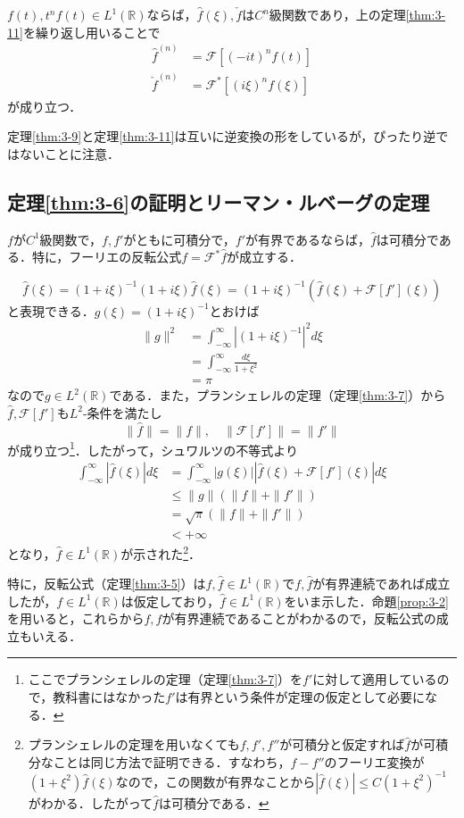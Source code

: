 \documentclass[dvipdfmx,a4j,10pt]{jsarticle}
\makeatletter
\theoremstyle{mystyle1}
\theoremstyle{mystyle3}
\theoremstyle{mystyle4}
\theoremstyle{mystyle6}
\theoremstyle{mystyle2}
\theoremstyle{mystyle5}
\newtheorem{theorem*}{定理}
\renewenvironment{proof}[1][\proofname]{\par
  \pushQED{\qed}%
  \normalfont
  \topsep6\p@\@plus6\p@ \trivlist
  \item[\hskip\labelsep{\bfseries\sffamily #1}]\ignorespaces
}{%
  \popQED\endtrivlist\@endpefalse
}
\renewcommand\proofname{証明}
\newenvironment{thm*}[1][]
{\begin{tcolorbox}[
    enhanced,
    boxrule=0pt,
    arc=0mm,
    frame hidden,
    borderline west={2pt}{-4pt}{red},
    breakable = true
    ]
    \begin{theorem*}[#1]
}
{\end{theorem*}\end{tcolorbox}}
\makeatother
\begin{document}
$f(t),t^nf(t)\in L^1(\mathbb{R})$ならば，$\hat f(\xi),\check f$は$C^n$級関数であり，上の定理\ref{thm:3-11}を繰り返し用いることで
\[
	\begin{split}
		\hat f^{(n)}&=\mathcal{F}[(-it)^nf(t)] \\
		\check f^{(n)}&=\mathcal{F}^*[(i\xi)^n f(\xi)]
	\end{split}
\]
が成り立つ．

定理\ref{thm:3-9}と定理\ref{thm:3-11}は互いに逆変換の形をしているが，ぴったり逆ではないことに注意．


\subsection{定理\ref{thm:3-6}の証明とリーマン・ルベーグの定理}\label{sec:3-7}

\begin{thm*}
	$f$が$C^1$級関数で，$f,f'$がともに可積分で，$f'$が有界であるならば，$\hat f$は可積分である．特に，フーリエの反転公式$f=\mathcal{F}^*\hat f$が成立する．
\end{thm*}

\begin{proof}
	\[
		\hat f(\xi)	=(1+i\xi)^{-1}(1+i\xi)\hat f(\xi)=(1+i\xi)^{-1}(\hat f(\xi)+\mathcal{F}[f'](\xi))
	\]
	と表現できる．$g(\xi)=(1+i\xi)^{-1}$とおけば
	\[
		\begin{split}
			\|g\|^2&=\int_{-\infty}^\infty|(1+i\xi)^{-1}|^2d\xi \\
			&=\int_{-\infty}^\infty \frac{d\xi}{1+\xi^2} \\
			&=\pi
		\end{split}
	\]
	なので$g\in L^2(\mathbb{R})$である．また，プランシェレルの定理（定理\ref{thm:3-7}）から$\hat f,\mathcal{F}[f']$も$L^2$-条件を満たし
	\[
		\|\hat f\|=\|f\|,\quad\|\mathcal{F}[f']\|=\|f'\|
	\]
	が成り立つ\footnote{ここでプランシェレルの定理（定理\ref{thm:3-7}）を$f'$に対して適用しているので，教科書にはなかった$f'$は有界という条件が定理の仮定として必要になる．}．したがって，シュワルツの不等式より
	\[
		\begin{split}
			\int_{-\infty}^\infty|\hat f(\xi)|d\xi
			&=\int_{-\infty}^\infty |g(\xi)||\hat f(\xi)+\mathcal{F}[f'](\xi)|d\xi \\
			&\leq\|g\|(\|f\|+\|f'\|) \\
			&=\sqrt{\pi}(\|f\|+\|f'\|) \\
			&<+\infty
		\end{split}
	\]
	となり，$\hat f\in L^1(\mathbb{R})$が示された\footnote{プランシェレルの定理を用いなくても$f,f',f''$が可積分と仮定すれば$\hat f$が可積分なことは同じ方法で証明できる．すなわち，$f-f''$のフーリエ変換が$(1+\xi^2)\hat f(\xi)$なので，この関数が有界なことから$|\hat f(\xi)|\leq C(1+\xi^2)^{-1}$がわかる．したがって$\hat f$は可積分である．}．

	特に，反転公式（定理\ref{thm:3-5}）は$f,\hat f\in L^1(\mathbb{R})$で$f,\hat f$が有界連続であれば成立したが，$f\in L^1(\mathbb{R})$は仮定しており，$\hat f\in L^1(\mathbb{R})$をいま示した．命題\ref{prop:3-2}を用いると，これらから$f,\hat f$が有界連続であることがわかるので，反転公式の成立もいえる．
\end{proof}
\end{document}
